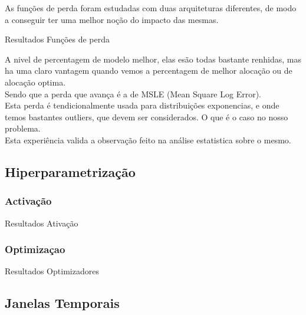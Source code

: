 As funções de perda foram estudadas com duas arquiteturas diferentes, de modo a conseguir ter uma melhor noção do impacto das mesmas. \\

\begin{table}[H]
\caption{Resultados Funções de perda}        
\end{table}

A nivel de percentagem de modelo melhor, elas esão todas bastante renhidas, mas ha uma claro vantagem quando vemos a percentagem de melhor alocação ou de alocação optima.\\
Sendo que a perda que avança é a de MSLE (Mean Square Log Error).\\
Esta perda é tendicionalmente usada para distribuições exponencias, e onde temos bastantes outliers, que devem ser considerados. O que é o caso no nosso problema.\\
Esta experiência valida a observação feito na análise estatistica sobre o mesmo.\\

\subsection{Hiperparametrização\label{se:hiper}}

\subsubsection{Activação\label{se:activ}}

\begin{table}[H]
\caption{Resultados Ativação}    
\end{table}

\subsubsection{Optimizaçao\label{se:opt}}

\begin{table}[H]
\caption{Resultados Optimizadores}    
\end{table}


\subsection{Janelas Temporais}

